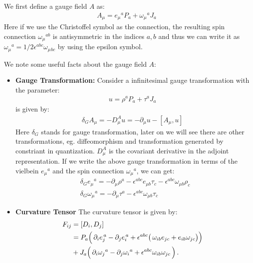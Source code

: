 We first define a gauge field $ A $ as:
\begin{align}
  A_\mu = e_\mu{}^a P_a + \omega_\mu{}^a J_a
\end{align}
Here if we use the Christoffel symbol as the connection, the
resulting spin connection $ \omega_\mu{}^{ab} $ is antisymmetric in
the indices $ a, b $ and thus we can write it as $ \omega_\mu{}^a =
1/2 \epsilon^{abc} \omega_\mu{}_{bc}$
by using the epsilon symbol.

We note some useful facts about the gauge field $ A $:
\begin{itemize}
  \item \textbf{Gauge Transformation:} Consider a infinitesimal gauge
    transformation with the parameter:
    \begin{align}
      u = \rho^a P_a + \tau^a J_a
    \end{align}
    is given by:
    \begin{align}
      \delta_G A_\mu = -D_\mu^A u = - \partial_\mu u - [A_\mu, u]
    \end{align}
    Here $ \delta_G $ stands for gauge transformation, later on we
    will see there are other transformations, eg. diffeomorphism and
    transformation generated by constriant in quantization. $
    D_\mu^A$ is the covariant derivative in the adjoint representation.
    If we write the above gauge transformation in terms of the
    vielbein $ e_\mu{}^a $ and the spin connection $ \omega_\mu{}^a
    $, we can get:
    \begin{align}\label{eq:gaugetransform}
      & \delta_G e_\mu{}^a = -\partial_\mu \rho^a - \epsilon^{abc} e_{\mu b}
      \tau_c - \epsilon^{abc} \omega_{\mu b} \rho_c \\
      &\delta_G \omega_\mu{}^a = -\partial_\mu \tau^a - \epsilon^{abc}
      \omega_{\mu b}
      \tau_c
    \end{align}
  \item \textbf{Curvature Tensor} The curvature tensor is given by:
    \begin{align}
      F_{ij}&=\left[{D}_{i},{D}_{j}\right]\\
      &=P_{a}\Big{(}\,\partial_{i}e_{j}^{\,a}-\partial_{j}e_{i}^{\,a}+\epsilon^{abc}\big{(}\,\omega_{ib}e_{jc}+e_{ib}\omega_{jc}\big{)}\Big{)}
      \\
      &+J_{a}\Big{(}\,\partial_{i}\omega_{j}{}^{a}-\partial_{j}\omega_{i}{}^{a}+\epsilon^{abc}\omega_{ib}\omega_{jc}\,\Big{)}\,.
    \end{align}
\end{itemize}
